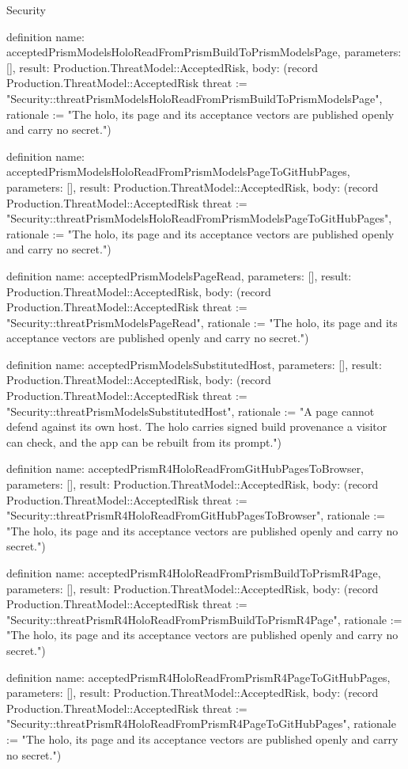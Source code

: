 \begin{lexlean}{Security}
\begin{semanticmodule}
definition{
  name: acceptedPrismModelsHoloReadFromPrismBuildToPrismModelsPage,
  parameters: [],
  result: Production.ThreatModel::AcceptedRisk,
  body: (record Production.ThreatModel::AcceptedRisk {threat := "Security::threatPrismModelsHoloReadFromPrismBuildToPrismModelsPage", rationale := "The holo, its page and its acceptance vectors are published openly and carry no secret."})
}

definition{
  name: acceptedPrismModelsHoloReadFromPrismModelsPageToGitHubPages,
  parameters: [],
  result: Production.ThreatModel::AcceptedRisk,
  body: (record Production.ThreatModel::AcceptedRisk {threat := "Security::threatPrismModelsHoloReadFromPrismModelsPageToGitHubPages", rationale := "The holo, its page and its acceptance vectors are published openly and carry no secret."})
}

definition{
  name: acceptedPrismModelsPageRead,
  parameters: [],
  result: Production.ThreatModel::AcceptedRisk,
  body: (record Production.ThreatModel::AcceptedRisk {threat := "Security::threatPrismModelsPageRead", rationale := "The holo, its page and its acceptance vectors are published openly and carry no secret."})
}

definition{
  name: acceptedPrismModelsSubstitutedHost,
  parameters: [],
  result: Production.ThreatModel::AcceptedRisk,
  body: (record Production.ThreatModel::AcceptedRisk {threat := "Security::threatPrismModelsSubstitutedHost", rationale := "A page cannot defend against its own host. The holo carries signed build provenance a visitor can check, and the app can be rebuilt from its prompt."})
}

definition{
  name: acceptedPrismR4HoloReadFromGitHubPagesToBrowser,
  parameters: [],
  result: Production.ThreatModel::AcceptedRisk,
  body: (record Production.ThreatModel::AcceptedRisk {threat := "Security::threatPrismR4HoloReadFromGitHubPagesToBrowser", rationale := "The holo, its page and its acceptance vectors are published openly and carry no secret."})
}

definition{
  name: acceptedPrismR4HoloReadFromPrismBuildToPrismR4Page,
  parameters: [],
  result: Production.ThreatModel::AcceptedRisk,
  body: (record Production.ThreatModel::AcceptedRisk {threat := "Security::threatPrismR4HoloReadFromPrismBuildToPrismR4Page", rationale := "The holo, its page and its acceptance vectors are published openly and carry no secret."})
}

definition{
  name: acceptedPrismR4HoloReadFromPrismR4PageToGitHubPages,
  parameters: [],
  result: Production.ThreatModel::AcceptedRisk,
  body: (record Production.ThreatModel::AcceptedRisk {threat := "Security::threatPrismR4HoloReadFromPrismR4PageToGitHubPages", rationale := "The holo, its page and its acceptance vectors are published openly and carry no secret."})
}


\end{semanticmodule}
\end{lexlean}
